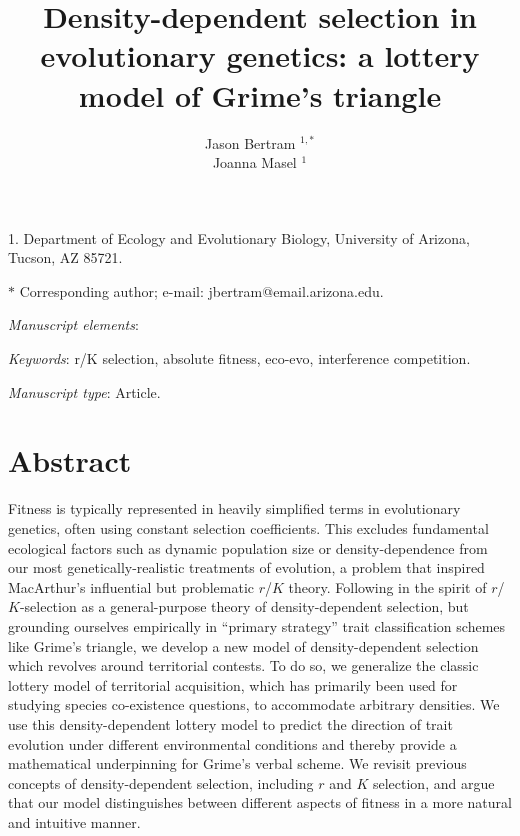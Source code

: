 \documentclass[11pt]{article}
\title{Density-dependent selection in evolutionary genetics: a lottery model of Grime's triangle}
\author{Jason Bertram $^{1,\ast}$ \\ 
Joanna Masel $^{1}$}
\date{}
\begin{document}
\maketitle

\noindent{}1. Department of Ecology and Evolutionary Biology, University of Arizona, Tucson, AZ 85721.

\noindent{}$\ast$ Corresponding author; e-mail: jbertram@email.arizona.edu.


\bigskip

\textit{Manuscript elements}: 

\bigskip

\textit{Keywords}: r/K selection, absolute fitness, eco-evo, interference competition.

\bigskip

\textit{Manuscript type}: Article. 

\bigskip


\linenumbers{}
\modulolinenumbers[3]

\newpage{}

\section*{Abstract}

Fitness is typically represented in heavily simplified terms in evolutionary genetics, often using constant selection coefficients. This excludes fundamental ecological factors such as dynamic population size or density-dependence from our most genetically-realistic treatments of evolution, a problem that inspired MacArthur's influential but problematic $r$/$K$ theory. Following in the spirit of $r$/$K$-selection as a general-purpose theory of density-dependent selection, but grounding ourselves empirically in ``primary strategy'' trait classification schemes like Grime's triangle, we develop a new model of density-dependent selection which revolves around territorial contests. To do so, we generalize the classic lottery model of territorial acquisition, which has primarily been used for studying species co-existence questions, to accommodate arbitrary densities. We use this density-dependent lottery model to predict the direction of trait evolution under different environmental conditions and thereby provide a mathematical underpinning for Grime's verbal scheme. We revisit previous concepts of density-dependent selection, including $r$ and $K$ selection, and argue that our model distinguishes between different aspects of fitness in a more natural and intuitive manner.
\end{document}
